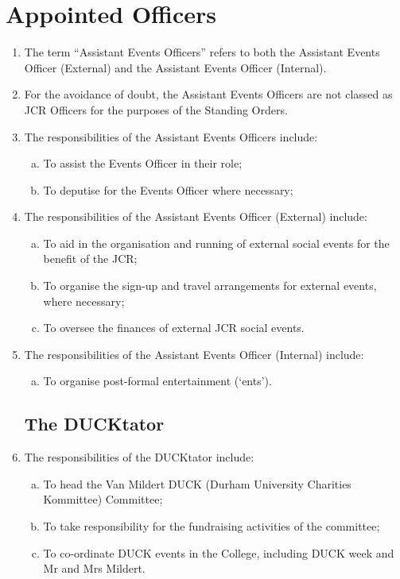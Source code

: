 \documentclass[12pt]{article}  %
\begin{document}
\section{Appointed Officers}
\begin{enumerate}
    \subsection{Assistant Events Officers}
    \item The term “Assistant Events Officers” refers to both the Assistant Events Officer (External) and the Assistant Events Officer (Internal).
    \item For the avoidance of doubt, the Assistant Events Officers are not classed as JCR Officers for the purposes of the Standing Orders.
    \item The responsibilities of the Assistant Events Officers include:
    \begin{enumerate}[(a)]
        \item To assist the Events Officer in their role;
        \item To deputise for the Events Officer where necessary;
    \end{enumerate}
    \item The responsibilities of the Assistant Events Officer (External) include:
    \begin{enumerate}[(a)]
        \item To aid in the organisation and running of external social events for the benefit of the JCR;
        \item To organise the sign-up and travel arrangements for external events, where necessary;
        \item To oversee the finances of external JCR social events.
    \end{enumerate}
    \item The responsibilities of the Assistant Events Officer (Internal) include:
    \begin{enumerate}[(a)]
        \item To organise post-formal entertainment (‘ents’).
    \end{enumerate}
    \subsection{The DUCKtator}
    \item The responsibilities of the DUCKtator include:
    \begin{enumerate}[(a)]
        \item To head the Van Mildert DUCK (Durham University Charities Kommittee) Committee;
        \item To take responsibility for the fundraising activities of the committee;
        \item To co-ordinate DUCK events in the College, including DUCK week and Mr and Mrs Mildert.
    \end{enumerate}

\end{enumerate}
\end{document}
